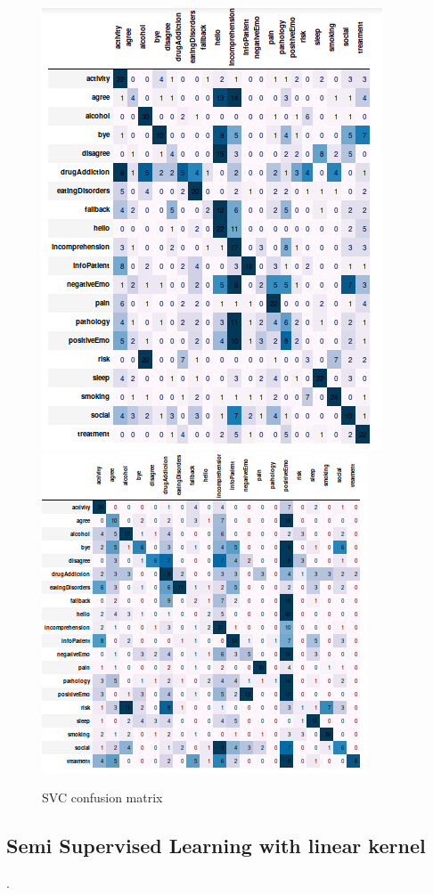 \documentclass[11pt]{article}
\begin{document}
\begin{figure}[h]
	\centering
	\includegraphics[scale=0.40]{svc0_cm.png}
	\includegraphics[scale=0.40]{lsvc_0.png}
	\caption{SVC confusion matrix}
\label{lda_gm_cm}
\end{figure}
\FloatBarrier


\subsection{Semi Supervised Learning with linear kernel}
\label{subsec:semisupervised}
.
  
\end{document}
